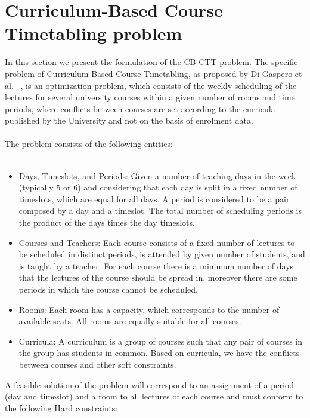 \chapter{Curriculum-Based Course Timetabling problem}
\label{cbcttproblem}
\thispagestyle{plain}

In this section we present the formulation of the CB-CTT problem.
The specific problem of Curriculum-Based Course Timetabling, as proposed by Di Gaspero et al. ~\cite{DiGasperoL.2007}, is an optimization problem, which consists of the weekly scheduling of the lectures for several university courses within a given number of rooms and time periods, where conflicts between courses are set according to the curricula published by the University and not on the basis of enrolment data.\\
\\
The problem consists of the following entities:\\
\\
\begin{itemize}
\item Days, Timeslots, and Periods: Given a number of teaching days in the week (typically 5 or 6) and considering that each day is split in a fixed number of timeslots, which are equal for all days. A period is considered to be a pair composed by a day and a timeslot. The total number of scheduling periods is the product of the days times the day timeslots. 
\item Courses and Teachers: Each course consists of a fixed number of lectures to be scheduled in distinct periods, is attended by given number of students, and is taught by a teacher. For each course there is a minimum number of days that the lectures of the course should be spread in, moreover there are some periods in which the course cannot be scheduled.
\item Rooms: Each room has a capacity, which corresponds to the number of available seats. All rooms are equally suitable for all courses.
\item Curricula: A curriculum is a group of courses such that any pair of courses in the group has students in common. Based on curricula, we have the conflicts between courses and other soft constraints. 
\end{itemize}
A feasible solution of the problem will correspond to an assignment of a period (day and timeslot) and a room to all lectures of each course and must conform to the following Hard constraints:\\
\\
